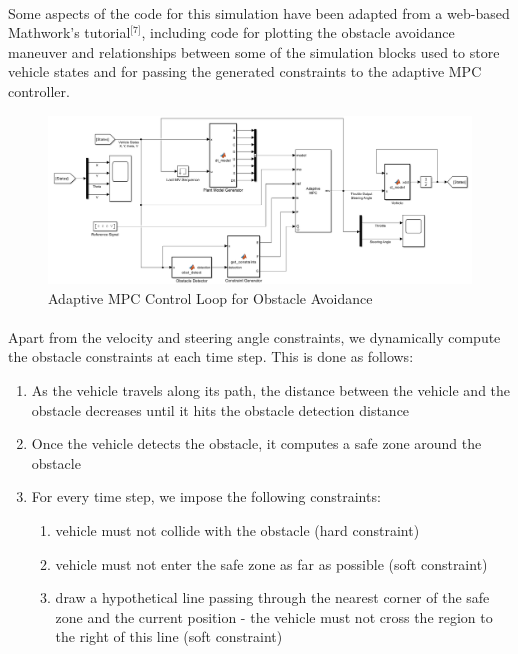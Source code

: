 \paragraph{}
Some aspects of the code for this simulation have been adapted from a web-based Mathwork's tutorial$^{\text{[7]}}$, including code for plotting the obstacle avoidance maneuver and relationships between some of the simulation blocks used to store vehicle states and for passing the generated constraints to the adaptive MPC controller. 

\begin{figure}[H]\label{fig4.9}
\centering \includegraphics[width=\textwidth]{Images/obstacle_avoidance_model.png}
\caption{Adaptive MPC Control Loop for Obstacle Avoidance}
\end{figure}

\paragraph{}
Apart from the velocity and steering angle constraints, we dynamically compute the obstacle constraints at each time step. This is done as follows:
\begin{enumerate}[label = (\arabic*), itemsep=-0.3em]
    \item As the vehicle travels along its path, the distance between the vehicle and the obstacle decreases until it hits the obstacle detection distance
    \item Once the vehicle detects the obstacle, it computes a safe zone around the obstacle
    \item For every time step, we impose the following constraints:
    \begin{enumerate}[label = (\roman*), itemsep=-0.3em]
        \item vehicle must not collide with the obstacle (hard constraint)
        \item vehicle must not enter the safe zone as far as possible (soft constraint)
        \item draw a hypothetical line passing through the nearest corner of the safe zone and the current position - the vehicle must not cross the region to the right of this line (soft constraint)
    \end{enumerate}
\end{enumerate}


